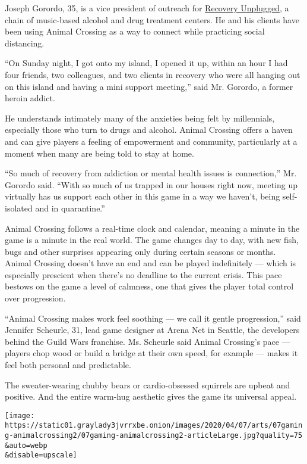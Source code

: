 Joseph Gorordo, 35, is a vice president of outreach for
\href{https://www.recoveryunplugged.com/}{Recovery Unplugged}, a chain
of music-based alcohol and drug treatment centers. He and his clients
have been using Animal Crossing as a way to connect while practicing
social distancing.

``On Sunday night, I got onto my island, I opened it up, within an hour
I had four friends, two colleagues, and two clients in recovery who were
all hanging out on this island and having a mini support meeting,'' said
Mr. Gorordo, a former heroin addict.

He understands intimately many of the anxieties being felt by
millennials, especially those who turn to drugs and alcohol. Animal
Crossing offers a haven and can give players a feeling of empowerment
and community, particularly at a moment when many are being told to stay
at home.

``So much of recovery from addiction or mental health issues is
connection,'' Mr. Gorordo said. ``With so much of us trapped in our
houses right now, meeting up virtually has us support each other in this
game in a way we haven't, being self-isolated and in quarantine.''

Animal Crossing follows a real-time clock and calendar, meaning a minute
in the game is a minute in the real world. The game changes day to day,
with new fish, bugs and other surprises appearing only during certain
seasons or months. Animal Crossing doesn't have an end and can be played
indefinitely --- which is especially prescient when there's no deadline
to the current crisis. This pace bestows on the game a level of
calmness, one that gives the player total control over progression.

``Animal Crossing makes work feel soothing --- we call it gentle
progression,'' said Jennifer Scheurle, 31, lead game designer at Arena
Net in Seattle, the developers behind the Guild Wars franchise. Ms.
Scheurle said Animal Crossing's pace --- players chop wood or build a
bridge at their own speed, for example --- makes it feel both personal
and predictable.

The sweater-wearing chubby bears or cardio-obsessed squirrels are upbeat
and positive. And the entire warm-hug aesthetic gives the game its
universal appeal.

\texttt{[image: https://static01.graylady3jvrrxbe.onion/images/2020/04/07/arts/07gaming-animalcrossing2/07gaming-animalcrossing2-articleLarge.jpg?quality=75\\\&auto=webp\\\&disable=upscale]}

